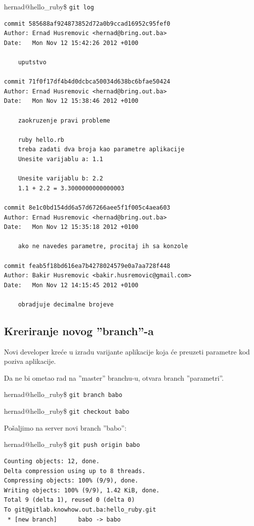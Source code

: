 \documentclass[times, utf8, seminar]{fit}
\begin{document}
hernad@hello\_ruby\$ \texttt{git log}
\begin{lstlisting}
commit 585688af924873852d72a0b9ccad16952c95fef0
Author: Ernad Husremovic <hernad@bring.out.ba>
Date:   Mon Nov 12 15:42:26 2012 +0100

    uputstvo

commit 71f0f17df4b4d0dcbca50034d638bc6bfae50424
Author: Ernad Husremovic <hernad@bring.out.ba>
Date:   Mon Nov 12 15:38:46 2012 +0100

    zaokruzenje pravi probleme
    
    ruby hello.rb
    treba zadati dva broja kao parametre aplikacije
    Unesite varijablu a: 1.1
    
    Unesite varijablu b: 2.2
    1.1 + 2.2 = 3.3000000000000003

commit 8e1c0bd154dd6a57d67266aee5f1f005c4aea603
Author: Ernad Husremovic <hernad@bring.out.ba>
Date:   Mon Nov 12 15:35:18 2012 +0100

    ako ne navedes parametre, procitaj ih sa konzole

commit feab5f18bd616ea7b4278024579e0a7aa728f448
Author: Bakir Husremovic <bakir.husremovic@gmail.com>
Date:   Mon Nov 12 14:15:45 2012 +0100

    obradjuje decimalne brojeve
\end{lstlisting}


\subsection{Kreriranje novog ''branch''-a}

Novi developer kreće u izradu varijante aplikacije koja će preuzeti parametre kod poziva aplikacije.

Da ne bi ometao rad na ''master'' branchu-u, otvara branch ''parametri''.

hernad@hello\_ruby\$ \texttt{git branch babo}

hernad@hello\_ruby\$ \texttt{git checkout babo}

Pošaljimo na server novi branch ''babo'':

hernad@hello\_ruby\$ \texttt{git push origin babo}
\begin{lstlisting}
Counting objects: 12, done.
Delta compression using up to 8 threads.
Compressing objects: 100% (9/9), done.
Writing objects: 100% (9/9), 1.42 KiB, done.
Total 9 (delta 1), reused 0 (delta 0)
To git@gitlab.knowhow.out.ba:hello_ruby.git
 * [new branch]      babo -> babo
\end{lstlisting}
\end{document}
